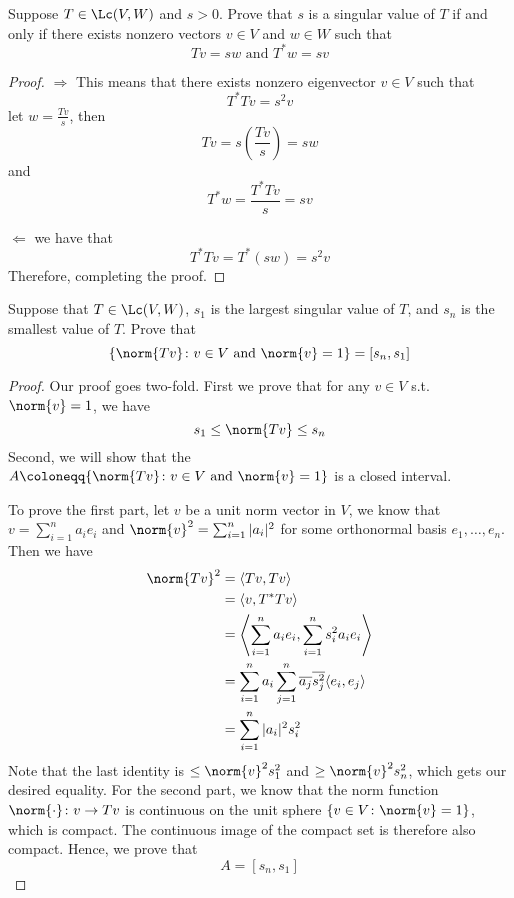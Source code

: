 \documentclass{extarticle}
\begin{document}
\begin{problem}{2}
    Suppose \(T \in \Lc(V, W)\) and \(s > 0\). Prove that \(s\) is a singular value of \(T\)
    if and only if there exists nonzero vectors \(v \in V\) and \(w \in W\) such that
    \[Tv = sw \text{ and } T^* w = sv\]
\end{problem}

\begin{proof}

\(\Rightarrow\) This means that there exists nonzero eigenvector \(v \in V\) such that
\[T^*T v = s^2 v\]
let \(w = \frac{Tv}{s}\), then
\[Tv = s\left(\frac{Tv}{s}\right) = sw\]
and
\[T^*w  = \frac{T^* Tv}{s} = sv\]

\(\Leftarrow\) we have that
\[T^*Tv = T^*(sw) = s^2v\]
Therefore, completing the proof.
\end{proof}

\begin{problem}{4}
    Suppose that \(T \in \Lc(V, W)\), \(s_1\) is the largest singular value of \(T\), and
    \(s_n\) is the smallest value of \(T\). Prove that
    \[\{\norm{Tv} \colon v \in V \text{ and } \norm{v} = 1\} = [s_n, s_1]\]
\end{problem}

\begin{proof}
Our proof goes two-fold. First we prove that for any \(v \in V\) s.t. \(\norm{v} = 1\), we have
\[s_1 \leq \norm{Tv} \leq s_n\]
Second, we will show that the \(A \coloneqq \{\norm{Tv} \colon v \in V \text{ and } \norm{v} = 1\} \)
is a closed interval.

To prove the first part, let \(v\) be a unit norm vector in \(V\), we know that
\(v = \sum_{i=1}^{n}a_i e_i\) and \(\norm{v}^2 = \sum_{i=1}^{n} |a_i|^2\) for some orthonormal
basis \(e_1, \ldots, e_n\). Then we have
\begin{align*}
    \norm{Tv}^2
    &= \langle Tv,Tv \rangle \\
    &= \langle v,T^*Tv \rangle \\
    &= \left\langle \sum_{i=1}^{n} a_i e_i, \sum_{i=1}^{n} s_i^2a_ie_i \right\rangle \\
    &= \sum_{i=1}^{n} a_i \sum_{j=1}^{n} \overline{a_j} \overline{s_j^2} \langle e_i,e_j \rangle \\
    &= \sum_{i=1}^{n} |a_i|^2 s_i^2 \\
\end{align*}
Note that the last identity is \(\leq \norm{v}^2 s_1^2\) and \(\geq \norm{v}^2 s_n^2\), which gets
our desired equality. For the second part, we know that the norm function \(\norm{\cdot} \colon
v \to Tv\) is continuous on the unit sphere \(\{v \in V \colon \norm{v}  =1\}\), which is compact. The
continuous image of the compact set is therefore also compact. Hence, we prove that
\[A = [s_n, s_1]\]
\end{proof}
\end{document}
